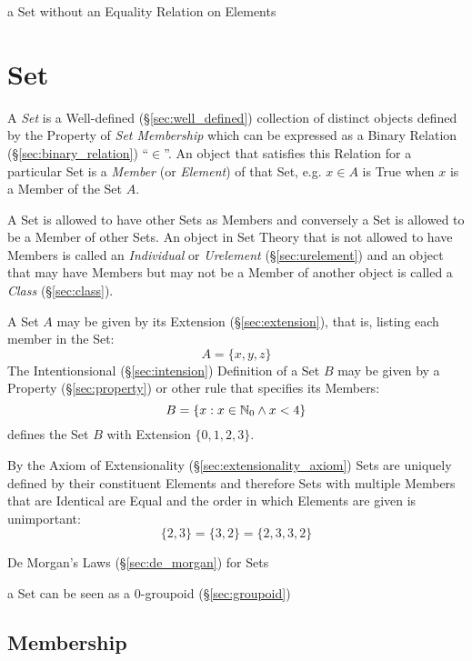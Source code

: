a Set without an Equality Relation on Elements



\section{Set}\label{sec:set}

A \emph{Set} is a Well-defined (\S\ref{sec:well_defined}) collection
of distinct objects defined by the Property of \emph{Set Membership}
which can be expressed as a Binary Relation
(\S\ref{sec:binary_relation}) ``$\in$''. An object that satisfies this
Relation for a particular Set is a \emph{Member} (or \emph{Element})
of that Set, e.g. $x \in A$ is True when $x$ is a Member of the Set
$A$.

A Set is allowed to have other Sets as Members and conversely a Set is
allowed to be a Member of other Sets. An object in Set Theory that is
not allowed to have Members is called an \emph{Individual} or
\emph{Urelement} (\S\ref{sec:urelement}) and an object that may have
Members but may not be a Member of another object is called a
\emph{Class} (\S\ref{sec:class}).

A Set $A$ may be given by its Extension (\S\ref{sec:extension}), that
is, listing each member in the Set:
\[
  A = \{x,y,z\}
\]
The Intentionsional (\S\ref{sec:intension}) Definition of a Set $B$
may be given by a Property (\S\ref{sec:property}) or other rule that
specifies its Members:
\[
  B = \{ x : x \in \mathbb{N}_0 \wedge x < 4 \}
\]
defines the Set $B$ with Extension $\{ 0, 1, 2, 3 \}$.

By the Axiom of Extensionality (\S\ref{sec:extensionality_axiom}) Sets
are uniquely defined by their constituent Elements and therefore Sets
with multiple Members that are Identical are Equal and the order in
which Elements are given is unimportant:
\[
  \{ 2, 3 \} = \{ 3, 2 \} = \{ 2, 3, 3, 2 \}
\]

De Morgan's Laws (\S\ref{sec:de_morgan}) for Sets

a Set can be seen as a $0$-groupoid (\S\ref{sec:groupoid})



\subsection{Membership}\label{sec:membership}

